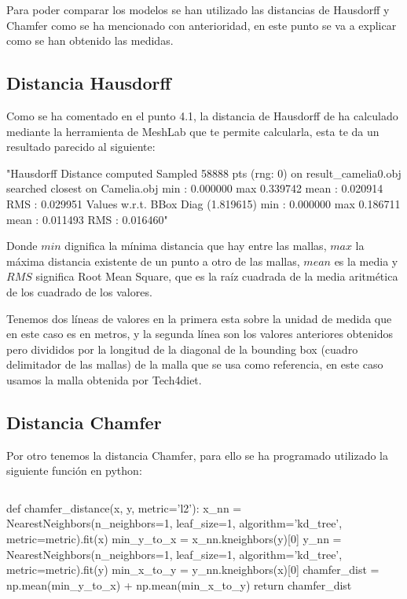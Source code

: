Para poder comparar los modelos se han utilizado las distancias de Hausdorff y Chamfer como se ha mencionado con anterioridad, en este punto se va a explicar como se han obtenido las medidas.

\subsection{Distancia Hausdorff}
Como se ha comentado en el punto 4.1, la distancia de Hausdorff de ha calculado mediante la herramienta de MeshLab que te permite calcularla, esta te da un resultado parecido al siguiente: 

\begin{python}
	"Hausdorff Distance computed
	Sampled 58888 pts (rng: 0) on result_camelia0.obj searched closest on Camelia.obj
	min : 0.000000 max 0.339742 mean : 0.020914 RMS : 0.029951
	Values w.r.t. BBox Diag (1.819615)
	min : 0.000000 max 0.186711 mean : 0.011493 RMS : 0.016460"
\end{python}

Donde $min$ dignifica la mínima distancia que hay entre las mallas, $max$ la máxima distancia existente de un punto a otro de las mallas, $mean$ es la media y $RMS$ significa Root Mean Square, que es la raíz cuadrada de la media aritmética de los cuadrado de los valores.

Tenemos dos líneas de valores en la primera esta sobre la unidad de medida que en este caso es en metros, y la segunda línea son los valores anteriores obtenidos pero divididos por la longitud de la diagonal de la bounding box (cuadro delimitador de las mallas) de la malla que se usa como referencia, en este caso usamos la malla obtenida por Tech4diet.

\pagebreak
\subsection{Distancia Chamfer}
Por otro tenemos la distancia Chamfer, para ello se ha programado utilizado la siguiente función en python:

\begin{lstlisting}[caption={Código obtención distancia chamfer}, label=cod:3]
\end{lstlisting}
\begin{python}
	def chamfer_distance(x, y, metric='l2'):
		x_nn = NearestNeighbors(n_neighbors=1, leaf_size=1, algorithm='kd_tree', metric=metric).fit(x)
		min_y_to_x = x_nn.kneighbors(y)[0]
		y_nn = NearestNeighbors(n_neighbors=1, leaf_size=1, algorithm='kd_tree', metric=metric).fit(y)
		min_x_to_y = y_nn.kneighbors(x)[0]
		chamfer_dist = np.mean(min_y_to_x) + np.mean(min_x_to_y)
	return chamfer_dist
\end{python}

